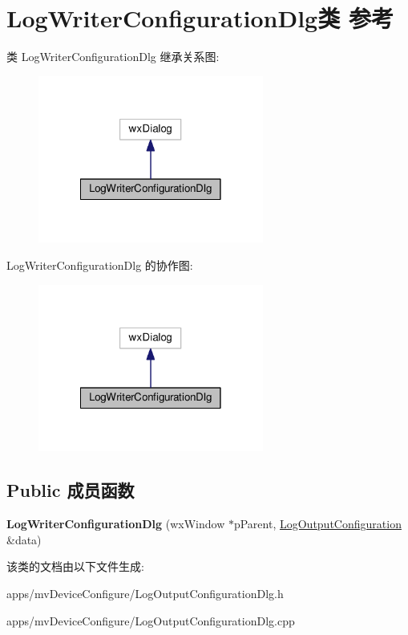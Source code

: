 \hypertarget{class_log_writer_configuration_dlg}{\section{Log\+Writer\+Configuration\+Dlg类 参考}
\label{class_log_writer_configuration_dlg}
}


类 Log\+Writer\+Configuration\+Dlg 继承关系图\+:
\nopagebreak
\begin{figure}[H]
\begin{center}
\leavevmode
\includegraphics[width=210pt]{class_log_writer_configuration_dlg__inherit__graph}
\end{center}
\end{figure}


Log\+Writer\+Configuration\+Dlg 的协作图\+:
\nopagebreak
\begin{figure}[H]
\begin{center}
\leavevmode
\includegraphics[width=210pt]{class_log_writer_configuration_dlg__coll__graph}
\end{center}
\end{figure}
\subsection*{Public 成员函数}
\begin{DoxyCompactItemize}
\item 
\hypertarget{class_log_writer_configuration_dlg_a38dc3a1c9732108f6a6b998c0366330e}{{\bfseries Log\+Writer\+Configuration\+Dlg} (wx\+Window $\ast$p\+Parent, \hyperlink{struct_log_output_configuration}{Log\+Output\+Configuration} \&data)}\label{class_log_writer_configuration_dlg_a38dc3a1c9732108f6a6b998c0366330e}

\end{DoxyCompactItemize}


该类的文档由以下文件生成\+:\begin{DoxyCompactItemize}
\item 
apps/mv\+Device\+Configure/Log\+Output\+Configuration\+Dlg.\+h\item 
apps/mv\+Device\+Configure/Log\+Output\+Configuration\+Dlg.\+cpp\end{DoxyCompactItemize}
